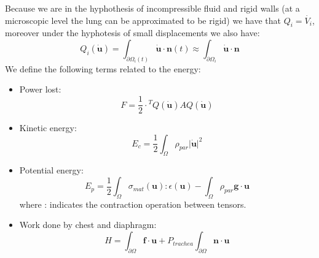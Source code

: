 \documentclass[11pt]{article}
\begin{document}
Because we are in the hyphothesis of incompressible fluid and rigid walls (at a microscopic level the lung can be approximated to be rigid) we have that $ Q_i = \dot{V_i}$, moreover under the hyphotesis of small displacements we also have:
\begin{equation}
Q_i(\dot{\textbf{u}}) = \int_{\partial\Omega_i(t)}\dot{\textbf{u}}\cdot\textbf{n}(t)\approx \int_{\partial\Omega_i}\dot{\textbf{u}}\cdot\textbf{n}
\end{equation}
We define the following terms related to the energy:
\begin{itemize}
\item Power lost:
\begin{equation}
F = \frac{1}{2}\cdot{}^TQ(\dot{\textbf{u}})AQ(\dot{\textbf{u}})
\end{equation}
\item Kinetic energy: 
\begin{equation}
E_c = \frac{1}{2}\int_\Omega{\rho_{par}|\dot{\textbf{u}}}|^2
\end{equation}
\item Potential energy:
\begin{equation}
E_p = \frac{1}{2}\int_\Omega\sigma_{mat}(\textbf{u}):\epsilon(\textbf{u}) - \int_\Omega\rho_{par}\textbf{g}\cdot \textbf{u}
\end{equation}
where : indicates the contraction operation between tensors.
\item Work done by chest and diaphragm:
 \begin{equation}
 H = \int_{\partial\Omega}\textbf{f}\cdot \textbf{u} + P_{trachea}\int_{\partial\Omega}\textbf{n}\cdot\textbf{u}
 \end{equation}
\end{itemize}
\end{document}
